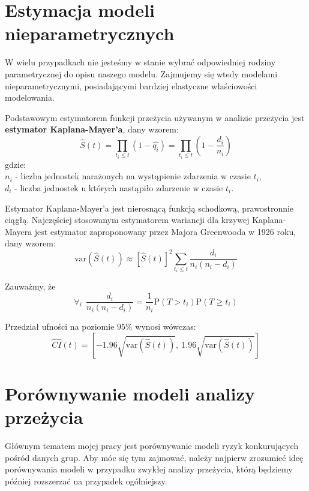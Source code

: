 \documentclass[]{pracamgr}
\begin{document}
\section{Estymacja modeli nieparametrycznych}

W wielu przypadkach nie jesteśmy w stanie wybrać odpowiedniej rodziny parametrycznej do opisu naszego modelu. Zajmujemy się wtedy modelami nieparametrycznymi, posiadającymi bardziej elastyczne właściowości modelowania. 

Podstawowym estymatorem funkcji przeżycia używanym w analizie przeżycia jest \textbf{estymator Kaplana-Mayer'a}, dany wzorem:
\begin{equation} \label{KME}
\hat{S}(t) = \prod_{t_i \leq t} (1-\hat{q_{i}}) =  \prod_{t_i \leq t} (1 - \frac{d_{i}}{n_{i}})
\end{equation} 
gdzie:
\\ $n_i$ - liczba jednostek narażonych na wystąpienie zdarzenia w czasie $t_i$,
\\ $d_i$ - liczba jednostek u których nastąpiło zdarzenie w czasie $t_i$.

Estymator Kaplana-Mayer'a jest nierosnącą funkcją schodkową, prawostronnie ciągłą. Najczęściej stosowanym estymatorem wariancji dla krzywej Kaplana-Mayera jest estymator zaproponowany przez Majora Greenwooda \cite{Greenwood} w 1926 roku, dany wzorem:
\begin{equation}
\mathrm{var}(\hat{S}(t)) \approx [\hat{S}(t)]^2 \sum_{t_i \leq t} \frac{d_i}{n_i (n_i - d_i)}
\end{equation}

Zauważmy, że
$$ \forall_i \ \  \frac{d_i}{n_i (n_i - d_i)} = \frac{1}{n_i} \mathrm{P}(T>t_i)\mathrm{P}(T \geq t_i) $$

Przedział ufności na poziomie $95\%$ wynosi wówczas:
\begin{equation}
\hat{CI}(t) = [-1.96 \sqrt{\mathrm{var}(\hat{S}(t))}, \ 1.96 \sqrt{\mathrm{var}(\hat{S}(t))}]
\end{equation}



\section{Porównywanie modeli analizy przeżycia}

Głównym tematem mojej pracy jest porównywanie modeli ryzyk konkurujących pośród danych grup. Aby móc się tym zajmować, należy najpierw zrozumieć ideę porównywania modeli w przypadku zwykłej analizy przeżycia, którą będziemy później rozszerzać na przypadek ogólniejszy.
\end{document}
